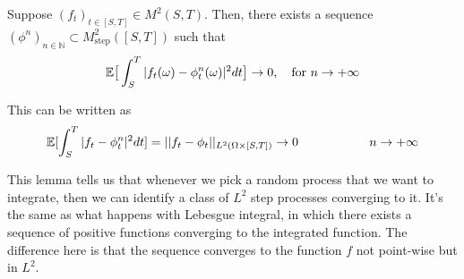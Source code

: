 \begin{Lemma}
\label{lemma_2}
    Suppose $(f_t)_{t \in [S,T]} \in M^2(S,T)$. Then, there exists a sequence $(\phi^n)_{n \in \mathbb{N}} \subset M^2_{\text{step}}([S,T])$ such that 
    \begin{equation*}
        \mathbb{E}\big[\int_S^T |f_t(\omega) - \phi_t^ n(\omega)|^2 dt\big] \rightarrow 0, \quad \text{for } n \rightarrow +\infty
    \end{equation*}
\end{Lemma}
This can be written as 
\begin{equation*}
    \mathbb{E}[\int_S^T |f_t - \phi_t^ n|^2 dt] = ||f_t - \phi_t||_{L^2(\Omega \times [S,T])} \rightarrow 0 \hspace{ 2 cm} n \rightarrow + \infty
\end{equation*}


This lemma tells us that whenever we pick a random process that we want to integrate, then we can identify a class of $L^2$ step processes converging to it. It's the same as what happens with Lebesgue integral, in which there exists a sequence of positive functions converging to the integrated function. The difference here is that the sequence converges to the function $f$ not point-wise but in $L^2$.  

